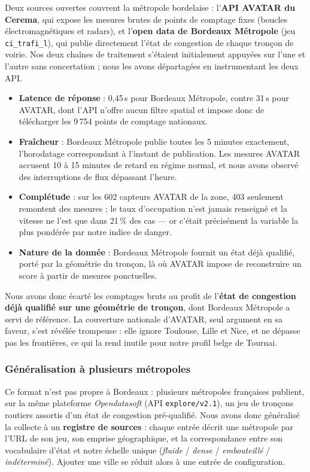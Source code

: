 Deux sources ouvertes couvrent la métropole bordelaise : l'\textbf{API AVATAR du Cerema}, qui expose les mesures brutes de points de comptage fixes (boucles électromagnétiques et radars), et l'\textbf{open data de Bordeaux Métropole} (jeu \texttt{ci\_trafi\_l}), qui publie directement l'état de congestion de chaque tronçon de voirie. Nos deux chaînes de traitement s'étaient initialement appuyées sur l'une et l'autre sans concertation ; nous les avons départagées en instrumentant les deux API.

\begin{itemize}
    \item \textbf{Latence de réponse} : 0,45\,s pour Bordeaux Métropole, contre 31\,s pour AVATAR, dont l'API n'offre aucun filtre spatial et impose donc de télécharger les 9\,754 points de comptage nationaux.
    \item \textbf{Fraîcheur} : Bordeaux Métropole publie toutes les 5 minutes exactement, l'horodatage correspondant à l'instant de publication. Les mesures AVATAR accusent 10 à 15 minutes de retard en régime normal, et nous avons observé des interruptions de flux dépassant l'heure.
    \item \textbf{Complétude} : sur les 602 capteurs AVATAR de la zone, 403 seulement remontent des mesures ; le taux d'occupation n'est jamais renseigné et la vitesse ne l'est que dans 21\,\% des cas — or c'était précisément la variable la plus pondérée par notre indice de danger.
    \item \textbf{Nature de la donnée} : Bordeaux Métropole fournit un état déjà qualifié, porté par la géométrie du tronçon, là où AVATAR impose de reconstruire un score à partir de mesures ponctuelles.
\end{itemize}

Nous avons donc écarté les comptages bruts au profit de l'\textbf{état de congestion déjà qualifié sur une géométrie de tronçon}, dont Bordeaux Métropole a servi de référence. La couverture nationale d'AVATAR, seul argument en sa faveur, s'est révélée trompeuse : elle ignore Toulouse, Lille et Nice, et ne dépasse pas les frontières, ce qui la rend inutile pour notre profil belge de Tournai.

\subsubsection{Généralisation à plusieurs métropoles}

Ce format n'est pas propre à Bordeaux : plusieurs métropoles françaises publient, sur la même plateforme \textit{Opendatasoft} (API \texttt{explore/v2.1}), un jeu de tronçons routiers assortis d'un état de congestion pré-qualifié. Nous avons donc généralisé la collecte à un \textbf{registre de sources} : chaque entrée décrit une métropole par l'URL de son jeu, son emprise géographique, et la correspondance entre son vocabulaire d'état et notre échelle unique (\textit{fluide} / \textit{dense} / \textit{embouteillé} / \textit{indéterminé}). Ajouter une ville se réduit alors à une entrée de configuration.


